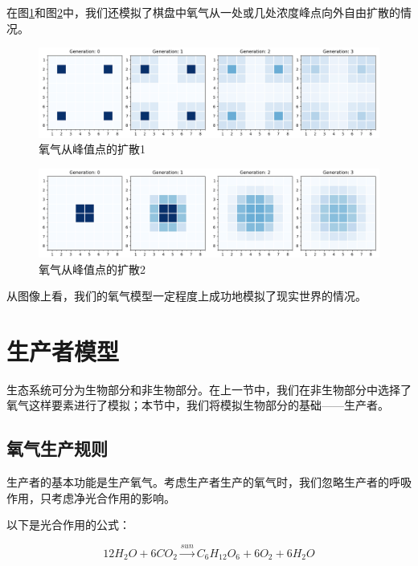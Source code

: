 \documentclass{ctexart}
\begin{document}
在图\ref{fig:oxygen-4polar-flow}和图\ref{fig:oxygen-polar-flow}中，我们还模拟了棋盘中氧气从一处或几处浓度峰点向外自由扩散的情况。

\begin{figure}[ht]
  \centering
  \includegraphics[width=\textwidth]{oxygen-4polar-flow.png}
  \caption{氧气从峰值点的扩散1}
  \label{fig:oxygen-4polar-flow}
\end{figure}

\begin{figure}[ht]
  \centering
  \includegraphics[width=\textwidth]{oxygen-polar-flow.png}
  \caption{氧气从峰值点的扩散2}
  \label{fig:oxygen-polar-flow}
\end{figure}

从图像上看，我们的氧气模型一定程度上成功地模拟了现实世界的情况。

\section{生产者模型}

生态系统可分为生物部分和非生物部分。在上一节中，我们在非生物部分中选择了氧气这样要素进行了模拟；本节中，我们将模拟生物部分的基础——生产者。

\subsection{氧气生产规则}

生产者的基本功能是生产氧气。考虑生产者生产的氧气时，我们忽略生产者的呼吸作用，只考虑净光合作用的影响。

以下是光合作用的公式：

\begin{equation}
  12H_2O + 6CO_2 \overset{sun}{\rightarrow} C_6H_{12}O_6 + 6O_2 + 6H_2O
  \label{equ:photosynthesis}
\end{equation}
\end{document}
